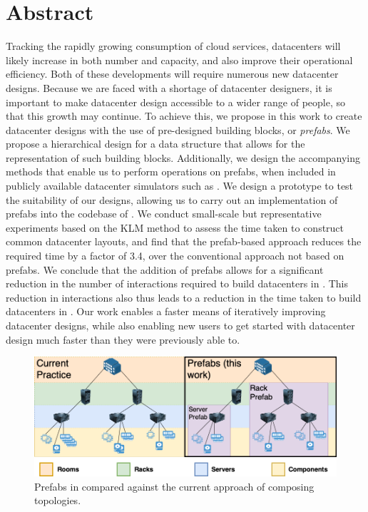 \documentclass[11pt]{article}
\begin{document}
\newpage


\setcounter{tocdepth}{2}
\tableofcontents
\newpage
\listoffigures
\listoftables
\newpage


\section*{Abstract}
Tracking the rapidly growing consumption of cloud services, datacenters will likely increase in both number and capacity, and also improve their operational efficiency. 
Both of these developments will require numerous new datacenter designs.
Because we are faced with a shortage of datacenter designers, it is important to make datacenter design accessible to a wider range of people, so that this growth may continue. 
To achieve this, we propose in this work to create datacenter designs with the use of pre-designed building blocks, or \textit{prefabs}. 
We propose a hierarchical design for a data structure that allows for the representation of such building blocks.
Additionally, we design the accompanying methods that enable us to perform operations on prefabs, when included in publicly available datacenter simulators such as \opendc{}. 
We design a prototype to test the suitability of our designs, allowing us to carry out an implementation of prefabs into the codebase of \opendc{}. 
We conduct small-scale but representative experiments based on the KLM method to assess the time taken to construct common datacenter layouts, and find that the prefab-based approach reduces the required time by a factor of 3.4, over the conventional approach not based on prefabs.
We conclude that the addition of prefabs allows for a significant reduction in the number of interactions required to build datacenters in \opendc{}. 
This reduction in interactions also thus leads to a reduction in the time taken to build datacenters in \opendc{}.
Our work enables a faster means of iteratively improving datacenter designs, while also enabling new users to get started with datacenter design much faster than they were previously able to.
\newpage

\begin{figure}
	\centering
	\includegraphics[width=\textwidth]{thesis_header.png}
	\caption[Topology composition in \opendc{} using prefabs]{Prefabs in \opendc{} compared against the current approach of composing topologies.}
	\label{fig:prefabsheader}
\end{figure}
\end{document}
